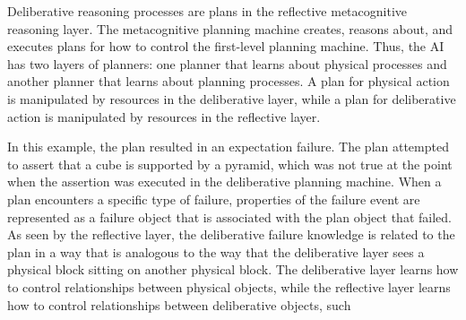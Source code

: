 Deliberative reasoning processes are plans in the reflective
metacognitive reasoning layer.  The metacognitive planning machine
creates, reasons about, and executes plans for how to control the
first-level planning machine.  Thus, the AI has two layers of
planners: one planner that learns about physical processes and another
planner that learns about planning processes.  A plan for physical
action is manipulated by resources in the deliberative layer, while a
plan for deliberative action is manipulated by resources in the
reflective layer.

In this example, the plan resulted in an expectation failure.  The
plan attempted to assert that a cube is supported by a pyramid, which
was not true at the point when the assertion was executed in the
deliberative planning machine.  When a plan encounters a specific type
of failure, properties of the failure event are represented as a
failure object that is associated with the plan object that failed.
As seen by the reflective layer, the deliberative failure knowledge is
related to the plan in a way that is analogous to the way that the
deliberative layer sees a physical block sitting on another physical
block.  The deliberative layer learns how to control relationships
between physical objects, while the reflective layer learns how to
control relationships between deliberative objects, such
